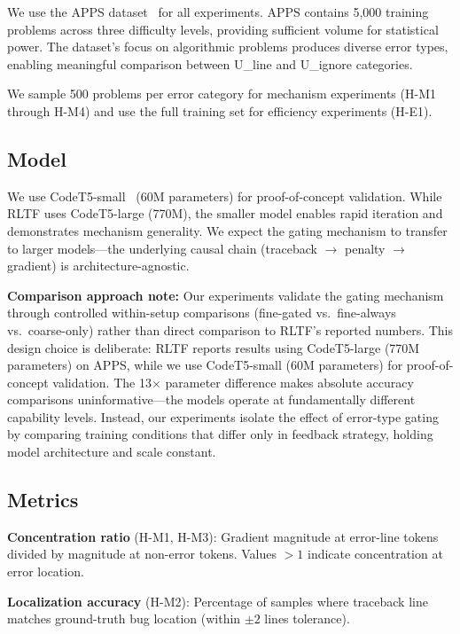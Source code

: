 We use the APPS dataset~\cite{hendrycks2021apps} for all experiments. APPS contains 5,000 training problems across three difficulty levels, providing sufficient volume for statistical power. The dataset's focus on algorithmic problems produces diverse error types, enabling meaningful comparison between U\_line and U\_ignore categories.

We sample 500 problems per error category for mechanism experiments (H-M1 through H-M4) and use the full training set for efficiency experiments (H-E1).

\subsection{Model}

We use CodeT5-small~\cite{wang2021codet5} (60M parameters) for proof-of-concept validation. While RLTF uses CodeT5-large (770M), the smaller model enables rapid iteration and demonstrates mechanism generality. We expect the gating mechanism to transfer to larger models---the underlying causal chain (traceback $\rightarrow$ penalty $\rightarrow$ gradient) is architecture-agnostic.

\textbf{Comparison approach note:} Our experiments validate the gating mechanism through controlled within-setup comparisons (fine-gated vs.\ fine-always vs.\ coarse-only) rather than direct comparison to RLTF's reported numbers. This design choice is deliberate: RLTF reports results using CodeT5-large (770M parameters) on APPS, while we use CodeT5-small (60M parameters) for proof-of-concept validation. The 13$\times$ parameter difference makes absolute accuracy comparisons uninformative---the models operate at fundamentally different capability levels. Instead, our experiments isolate the effect of error-type gating by comparing training conditions that differ only in feedback strategy, holding model architecture and scale constant.

\subsection{Metrics}

\textbf{Concentration ratio} (H-M1, H-M3): Gradient magnitude at error-line tokens divided by magnitude at non-error tokens. Values $>1$ indicate concentration at error location.

\textbf{Localization accuracy} (H-M2): Percentage of samples where traceback line matches ground-truth bug location (within $\pm2$ lines tolerance).

